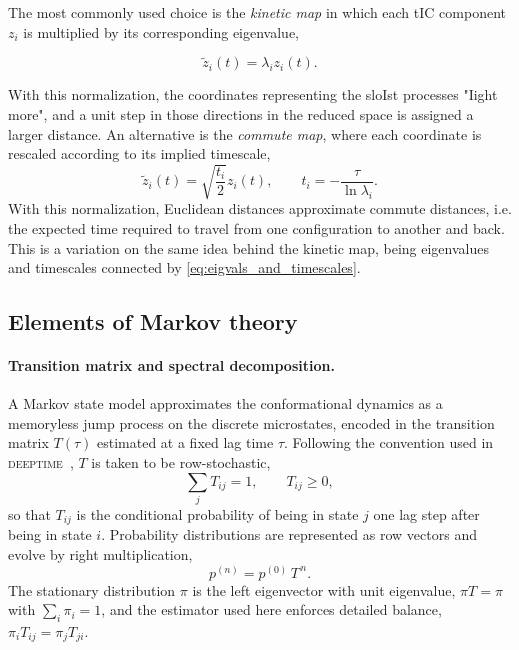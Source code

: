 The most commonly used choice is the \textit{kinetic map} in which each tIC component $z_i$ is multiplied by its corresponding eigenvalue,

\begin{equation}
\tilde z_i(t) = \lambda_i z_i(t).
\end{equation}

With this normalization, the coordinates representing the sloIst processes "Iight more", and a unit step in those directions in the reduced space is assigned a larger distance.
An alternative is the \textit{commute map}, where each coordinate is rescaled according to its implied timescale,
\begin{equation}
\tilde z_i(t) = \sqrt{\frac{t_i}{2}} z_i(t), \qquad t_i = -\frac{\tau}{\ln \lambda_i}.
\end{equation}
With this normalization, Euclidean distances approximate commute distances, i.e. the expected time required to travel from one configuration to another and back. This is a variation on the same idea behind the kinetic map, being eigenvalues and timescales connected by \eqref{eq:eigvals_and_timescales}.
%
%
%
%
%
%
%
%
%
%
%
%
%
%
%
%


\subsection{Elements of Markov theory}

\paragraph{Transition matrix and spectral decomposition.}
A Markov state model approximates the conformational dynamics as a
memoryless jump process on the discrete microstates, encoded in the
transition matrix $T(\tau)$ estimated at a fixed lag time $\tau$.
Following the convention used in \textsc{deeptime}~\cite{Deeptime2021},
$T$ is taken to be row-stochastic,
\begin{equation}
  \sum_j T_{ij} = 1, \qquad T_{ij} \geq 0,
  \label{eq:rowstoch}
\end{equation}
so that $T_{ij}$ is the conditional probability of being in state $j$
one lag step after being in state $i$. Probability distributions are
represented as row vectors and evolve by right multiplication,
\begin{equation}
  p^{(n)} = p^{(0)}\,T^{\,n}.
  \label{eq:propagation}
\end{equation}
The stationary distribution $\pi$ is the left eigenvector with unit
eigenvalue, $\pi T = \pi$ with $\sum_i \pi_i = 1$, and the estimator used
here enforces detailed balance, $\pi_i T_{ij} = \pi_j T_{ji}$.

